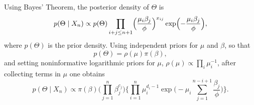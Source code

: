\documentclass[aps,pre,draft]{revtex4-2}
\begin{document}
Using Bayes’ Theorem, the posterior density of $\Theta$ is
\begin{equation}\label{eq:posterior}
p(\Theta\mid X_n)\propto p(\Theta)\prod_{i+j\le n+1}\Bigl(\frac{\mu_i\beta_j}{\phi}\Bigr)^{x_{ij}}\exp\Bigl(-\frac{\mu_i\beta_j}{\phi}\Bigr),
\end{equation}
where $p(\Theta)$ is the prior density. Using independent priors for $\mu$ and $\beta$, so that 
\[
p(\Theta)=\rho(\mu)\pi(\beta),
\]
and setting noninformative logarithmic priors for $\mu$, $\rho(\mu)\propto\prod_i\mu_i^{-1}$, after collecting terms in $\mu$ one obtains
\begin{equation}\label{eq:posterior2}
p(\Theta\mid X_n)\propto\pi(\beta)\Biggl(\prod_{j=1}^{n}\beta_j^{c_j}\Biggr)
\Biggl\{\prod_{i=1}^{n}\mu_i^{d_i-1}\exp\Biggl(-\mu_i\sum_{j=1}^{n-i+1}\frac{\beta_j}{\phi}\Biggr)\Biggr\}.
\end{equation}
\end{document}
